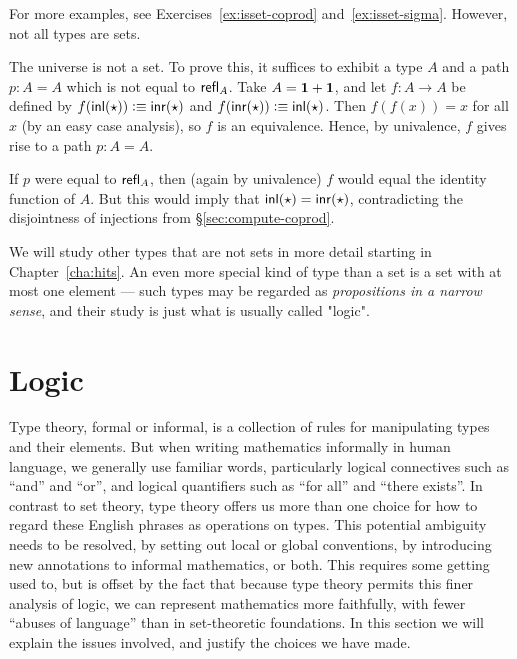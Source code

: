 For more examples, see Exercises~\ref{ex:isset-coprod} and~\ref{ex:isset-sigma}.
However, not all types are sets.

\begin{eg}\label{thm:type-is-not-a-set}
  The universe \type is not a set.
  To prove this, it suffices to exhibit a type $A$ and a path $p:A=A$ which is not equal to $\mathsf{refl}_{A}$.
  Take $A=\mathbf{1}+\mathbf{1}$, and let $f:A\to A$ be defined by $f(\mathsf{inl}(\star))\vcentcolon\equiv \mathsf{inr}(\star)$ and $f(\mathsf{inr}(\star))\vcentcolon\equiv \mathsf{inl}(\star)$.
  Then $f(f(x))=x$ for all $x$ (by an easy case analysis), so $f$ is an equivalence.
  Hence, by univalence, $f$ gives rise to a path $p:A=A$.

  If $p$ were equal to $\mathsf{refl}_{A}$, then (again by univalence) $f$ would equal the identity function of $A$.
  But this would imply that $\mathsf{inl}(\star)=\mathsf{inr}(\star)$, contradicting the disjointness of injections from \S\ref{sec:compute-coprod}.
\end{eg}

We will study other types that are not sets in more detail starting in Chapter~\ref{cha:hits}.  An even more special kind of type than a set is a set with at most one element --- such types may be regarded as \emph{propositions in a narrow sense}, and their study is just what is usually called "logic".

\section{Logic}
\label{sec:logic}

Type theory, formal or informal, is a collection of rules for manipulating types and their elements.
But when writing mathematics informally in human language, we generally use familiar words, particularly logical connectives such as ``and'' and ``or'', and logical quantifiers such as ``for all'' and ``there exists''.
In contrast to set theory, type theory offers us more than one choice for how to regard these English phrases as operations on types.
This potential ambiguity needs to be resolved, by setting out local or global conventions, by introducing new annotations to informal mathematics, or both.
This requires some getting used to, but is offset by the fact that because type theory permits this finer analysis of logic, we can represent mathematics more faithfully, with fewer ``abuses of language'' than in set-theoretic foundations.
In this section we will explain the issues involved, and justify the choices we have made.


